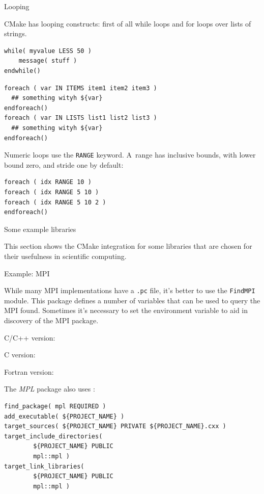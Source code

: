  {Looping}

CMake has looping constructs:
first of all while loops and for loops over lists of strings.

\begin{lstlisting}
while( myvalue LESS 50 )
    message( stuff )
endwhile()
\end{lstlisting}

\begin{lstlisting}
foreach ( var IN ITEMS item1 item2 item3 )
  ## something wityh ${var}
endforeach()
foreach ( var IN LISTS list1 list2 list3 )
  ## something wityh ${var}
endforeach()
\end{lstlisting}

Numeric loops use the \lstinline{RANGE} keyword.
A~range has inclusive bounds, with lower bound zero, and stride one by default:
\begin{lstlisting}
foreach ( idx RANGE 10 )
foreach ( idx RANGE 5 10 )
foreach ( idx RANGE 5 10 2 )
endforeach()
\end{lstlisting}


 {Some example libraries}

This section shows the CMake integration for some libraries that are chosen
for their usefulness in scientific computing.

 {Example: MPI}


While many MPI implementations have a \lstinline[language=shell]{.pc} file,
it's better to use the \lstinline{FindMPI} module.
This package defines a number of variables
that can be used to query the MPI found.
Sometimes it's necessary to set the 
environment variable to aid in discovery of the MPI package.

  C/C++ version:
%


  C version:
  

  Fortran version:
  

The \emph{MPL} package also uses :
\begin{lstlisting}
find_package( mpl REQUIRED )
add_executable( ${PROJECT_NAME} )
target_sources( ${PROJECT_NAME} PRIVATE ${PROJECT_NAME}.cxx )
target_include_directories(
        ${PROJECT_NAME} PUBLIC
        mpl::mpl )
target_link_libraries(
        ${PROJECT_NAME} PUBLIC
        mpl::mpl )
\end{lstlisting}

